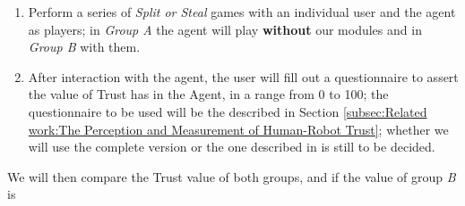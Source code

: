 \begin{enumerate}
	\item Perform a series of \textit{Split or Steal} games with an individual user and the agent as players; in \textit{Group A} the agent will play \textbf{without} our modules and in \textit{Group B} with them.
	\item After interaction with the agent, the user will fill out a questionnaire to assert the value of Trust has in the Agent, in a range from 0 to 100; the questionnaire to be used will be the described in Section \ref{subsec:Related work:The Perception and Measurement of Human-Robot Trust}; whether we will use the complete version or the one described in %
	is still to be decided.
\end{enumerate}

We will then compare the Trust value of both groups, and if the value of group \textit{B} is 